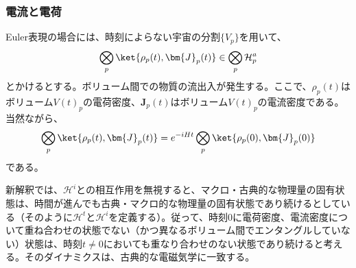 \subsubsection{電流と電荷}
Euler表現の場合には、時刻によらない宇宙の分割$\{V_p\}$を用いて、
\begin{equation}
    \label{eq:euler_classical_fluid_state}
    \bigotimes_p \ket{\rho_p(t),\bm{J}_p(t)} \in \bigotimes_p \mathcal{H}_p^a
\end{equation}
とかけるとする。ボリューム間での物質の流出入が発生する。ここで、$\rho_p(t)$はボリューム$V(t)_p$の電荷密度、$\bm{J}_p(t)$はボリューム$V(t)_p$の電流密度である。
当然ながら、
\begin{equation}
    \bigotimes_p \ket{\rho_p(t),\bm{J}_p(t)} = e^{-iHt}\bigotimes_p \ket{\rho_p(0),\bm{J}_p(0)}
\end{equation}
である。\par
新解釈では、$\mathcal{H}^i$との相互作用を無視すると、マクロ・古典的な物理量の固有状態は、時間が進んでも古典・マクロ的な物理量の固有状態であり続けるとしている（そのように$\mathcal{H}^t$と$\mathcal{H}^i$を定義する）。従って、時刻$0$に電荷密度、電流密度について重ね合わせの状態でない（かつ異なるボリューム間でエンタングルしていない）状態は、時刻$t \neq 0$においても重なり合わせのない状態であり続けると考える。そのダイナミクスは、古典的な電磁気学に一致する。